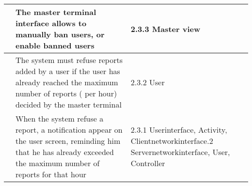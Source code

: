 \begin{center}
\begin{longtable}{| m{2cm} | m{6cm} | m{5cm} | }
      & The master terminal interface allows to manually ban users, or enable banned users& 2.3.3 Master view\\ \hline
      & The system must refuse reports added by a user if the user has already reached the maximum number of reports ( per hour) decided
	 by the master terminal& 2.3.2 User \\ \hline
      & When the system refuse a report, a notification appear on the user screen, reminding him that he has already exceeded
	the maximum number of reports for that hour& 2.3.1 Userinterface, Activity, Clientnetworkinterface\newline
						     2.3.2 Servernetworkinterface, User, Controller\\ \hline
 \end{longtable}
\end{center}
